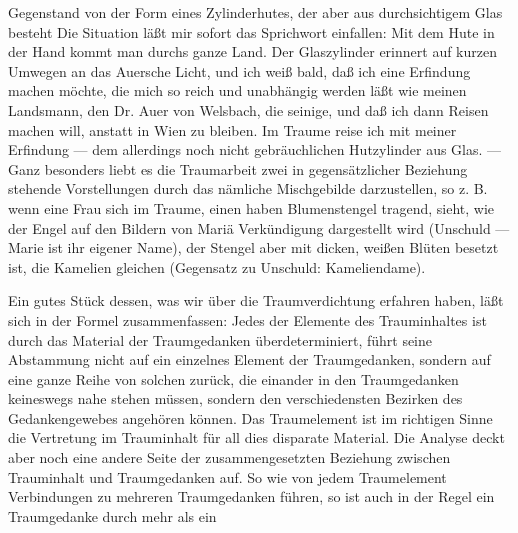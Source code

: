 \documentclass[twoside=true,titlepage=false,open=any, parskip=never, fontsize=10pt, headings=small, chapterprefix=false, appendixprefix=false]{scrbook}
\begin{document}
         
            
            
            
        \pstart
        Gegenstand von der Form eines Zylinderhutes, der aber aus durchsichtigem Glas besteht Die Situation läßt mir sofort das Sprichwort einfallen: Mit dem Hute in der Hand kommt man durchs ganze
               Land. Der Glaszylinder erinnert auf kurzen Umwegen an das Auersche Licht, und ich
               weiß bald, daß ich eine Erfindung machen möchte, die mich so reich und
               unabhängig werden läßt wie meinen Landsmann, den Dr. Auer von Welsbach, die seinige, und daß ich dann Reisen machen
               will, anstatt in Wien zu bleiben. Im Traume reise ich mit meiner Erfindung
               — dem allerdings noch nicht gebräuchlichen Hutzylinder aus Glas. — Ganz
               besonders liebt es die Traumarbeit zwei in gegensätzlicher Beziehung
               stehende Vorstellungen durch das nämliche Mischgebilde darzustellen, so z. B.
               wenn eine Frau sich im Traume, einen haben Blumenstengel tragend, sieht, wie der
               Engel auf den Bildern von Mariä Verkündigung dargestellt wird (Unschuld —
               Marie ist ihr eigener Name), der Stengel aber mit dicken, weißen Blüten besetzt
               ist, die Kamelien gleichen (Gegensatz zu Unschuld: Kameliendame).
        \pend
    
            
        \pstart
        Ein gutes Stück dessen, was wir über die Traumverdichtung erfahren haben, läßt
               sich in der Formel zusammenfassen: Jedes der Elemente des Trauminhaltes ist
               durch das Material der Traumgedanken überdeterminiert, führt seine Abstammung nicht auf ein einzelnes
               Element der Traumgedanken, sondern auf eine ganze Reihe von solchen zurück, die
               einander in den Traumgedanken keineswegs nahe stehen müssen, sondern den
               verschiedensten Bezirken des Gedankengewebes angehören können. Das Traumelement
               ist im richtigen Sinne die Vertretung im
                  Trauminhalt für all dies disparate Material. Die Analyse deckt aber noch
               eine andere Seite der zusammengesetzten Beziehung zwischen Trauminhalt und
               Traumgedanken auf. So wie von jedem Traumelement Verbindungen zu
               mehreren Traumgedanken führen, so ist auch in der Regel ein Traumgedanke durch mehr als ein
        \pend
    
         
            
            
            
\end{document}
